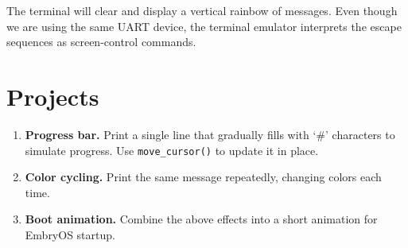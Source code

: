 The terminal will clear and display a vertical rainbow of messages.  Even
though we are using the same UART device, the terminal emulator interprets the
escape sequences as screen-control commands.

\section{Projects}

\begin{enumerate}
  \item \textbf{Progress bar.}
        Print a single line that gradually fills with `\#' characters to
        simulate progress.  Use \texttt{move\_cursor()} to update it in place.
  \item \textbf{Color cycling.}
        Print the same message repeatedly, changing colors each time.
  \item \textbf{Boot animation.}
        Combine the above effects into a short animation for EmbryOS startup.
\end{enumerate}
